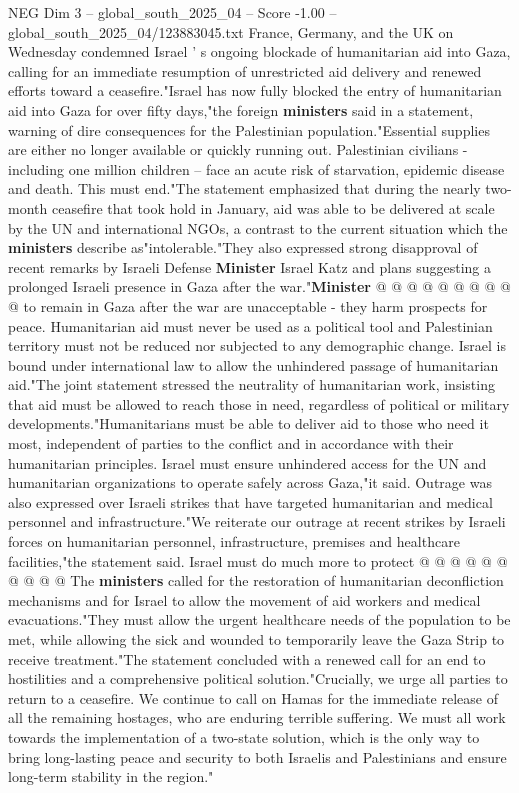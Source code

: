 \begin{textsample}{NEG Dim 3 – global\_south\_2025\_04 – Score -1.00 – global\_south\_2025\_04/123883045.txt}  \label{ex:f3_neg_339}
France, Germany, and the UK on Wednesday condemned Israel ' s ongoing blockade of humanitarian aid into Gaza, calling for an immediate resumption of unrestricted aid delivery and renewed efforts toward a ceasefire."Israel has now fully blocked the entry of humanitarian aid into Gaza for over fifty days,"the foreign \textbf{ministers} said in a statement, warning of dire consequences for the Palestinian population."Essential supplies are either no longer available or quickly running out.
Palestinian civilians - including one million children -- face an acute risk of starvation, epidemic disease and death.
This must end."The statement emphasized that during the nearly two-month ceasefire that took hold in January, aid was able to be delivered at scale by the UN and international NGOs, a contrast to the current situation which the \textbf{ministers} describe as"intolerable."They also expressed strong disapproval of recent remarks by Israeli Defense \textbf{Minister} Israel Katz and plans suggesting a prolonged Israeli presence in Gaza after the war."\textbf{Minister} @ @ @ @ @ @ @ @ @ @ to remain in Gaza after the war are unacceptable - they harm prospects for peace.
Humanitarian aid must never be used as a political tool and Palestinian territory must not be reduced nor subjected to any demographic change.
Israel is bound under international law to allow the unhindered passage of humanitarian aid."The joint statement stressed the neutrality of humanitarian work, insisting that aid must be allowed to reach those in need, regardless of political or military developments."Humanitarians must be able to deliver aid to those who need it most, independent of parties to the conflict and in accordance with their humanitarian principles.
Israel must ensure unhindered access for the UN and humanitarian organizations to operate safely across Gaza,"it said.
Outrage was also expressed over Israeli strikes that have targeted humanitarian and medical personnel and infrastructure."We reiterate our outrage at recent strikes by Israeli forces on humanitarian personnel, infrastructure, premises and healthcare facilities,"the statement said.
Israel must do much more to protect @ @ @ @ @ @ @ @ @ @ The \textbf{ministers} called for the restoration of humanitarian deconfliction mechanisms and for Israel to allow the movement of aid workers and medical evacuations."They must allow the urgent healthcare needs of the population to be met, while allowing the sick and wounded to temporarily leave the Gaza Strip to receive treatment."The statement concluded with a renewed call for an end to hostilities and a comprehensive political solution."Crucially, we urge all parties to return to a ceasefire.
We continue to call on Hamas for the immediate release of all the remaining hostages, who are enduring terrible suffering.
We must all work towards the implementation of a two-state solution, which is the only way to bring long-lasting peace and security to both Israelis and Palestinians and ensure long-term stability in the region."

\end{textsample}
